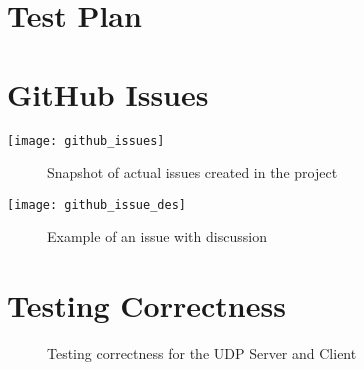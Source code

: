 \begin{appendices}

%
\chapter{Test Plan}


%
\chapter{GitHub Issues}
\begin{center}
	\texttt{[image: github\_issues]}
	\begin{figure}[h]
		\caption{Snapshot of actual issues created in the project}
		\label{ref:GitHubIssues}
	\end{figure}			
\end{center}

\begin{center}
	\texttt{[image: github\_issue\_des]}
	\begin{figure}[h]
		\caption{Example of an issue with discussion}
		\label{ref:GitHubIssueExample}
	\end{figure}	
\end{center}

%
\chapter{Testing Correctness}
\begin{center}
	\label{ref:testingCorrect}
	
	\begin{figure}[h]
		\caption{Testing correctness for the UDP Server and Client}
		\label{ref:testingUDP}
	\end{figure}
\end{center}
\end{appendices}
